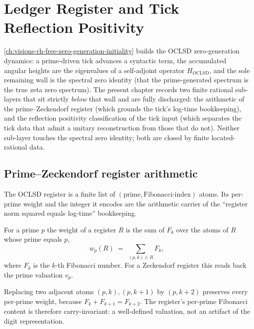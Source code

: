 \chapter{Ledger Register and Tick Reflection Positivity}
\label{ch:visions-rh-oclsd-ledger-reflection-layer}

\autoref{ch:visions-rh-free-zero-generation-initiality} builds the OCLSD
zero-generation dynamics: a prime-driven tick advances a syntactic term, the
accumulated angular heights are the eigenvalues of a self-adjoint operator
$H_{\mathrm{OCLSD}}$, and the sole remaining wall is the spectral zero identity
(that the prime-generated spectrum is the true zeta zero spectrum). The present
chapter records two finite rational sub-layers that sit strictly \emph{below}
that wall and are fully discharged: the arithmetic of the prime--Zeckendorf
register (which grounds the tick's log-time bookkeeping), and the reflection
positivity classification of the tick input (which separates the tick data that
admit a unitary reconstruction from those that do not). Neither sub-layer touches
the spectral zero identity; both are closed by finite located-rational data.

\section{Prime--Zeckendorf register arithmetic}

The OCLSD register is a finite list of $(\text{prime}, \text{Fibonacci-index})$
atoms. Its per-prime weight and the integer it encodes are the arithmetic carrier
of the ``register norm squared equals log-time'' bookkeeping.

\begin{definition}
\label{def:oclsd-register-fib-weight}
For a prime $p$ the weight of a register $R$ is the sum of $F_k$ over the atoms of
$R$ whose prime equals $p$,
$$
w_p(R) \;=\; \sum_{(p,k)\in R} F_k,
$$
where $F_k$ is the $k$-th Fibonacci number. For a Zeckendorf register this reads
back the prime valuation $v_p$.
\end{definition}

\begin{theorem}
\label{thm:oclsd-register-carry-isometry}
Replacing two adjacent atoms $(p,k),(p,k+1)$ by $(p,k+2)$ preserves every per-prime
weight, because $F_k+F_{k+1}=F_{k+2}$. The register's per-prime Fibonacci content is
therefore carry-invariant: a well-defined valuation, not an artifact of the digit
representation.
\end{theorem}

